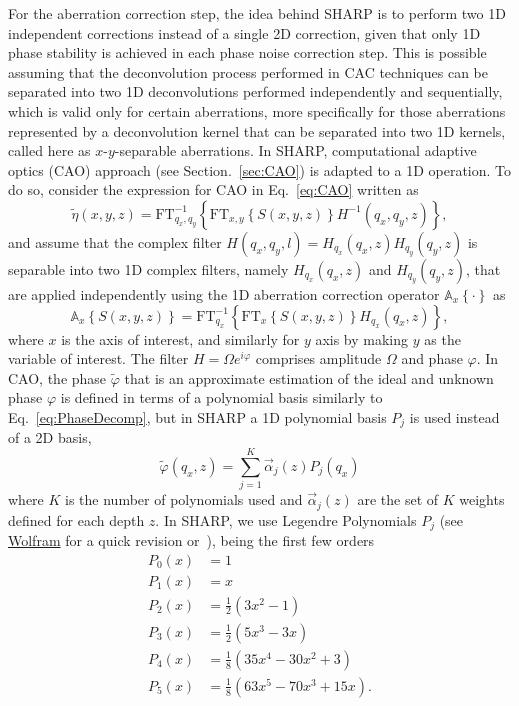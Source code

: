 For the aberration correction step, the idea behind SHARP is to perform two 1D independent corrections instead of a single 2D correction, given that only 1D phase stability is achieved in each phase noise correction step. This is possible assuming that the deconvolution process performed in CAC techniques can be separated into two 1D deconvolutions performed independently and sequentially, which is valid only for certain aberrations, more specifically for those aberrations represented by a deconvolution kernel that can be separated into two 1D kernels, called here as $x$-$y$-separable aberrations. In SHARP, computational adaptive optics (CAO) approach (see Section.~\ref{sec:CAO}) is adapted to a 1D operation. To do so, consider the expression for CAO in Eq.~\eqref{eq:CAO} written as
\begin{equation}
    \tilde{\eta}(x,y,z) = \text{FT}^{-1}_{q_x,q_y}\left\{\text{FT}_{x,y}\left\{S(x,y,z)\right\}H^{-1}(q_x,q_y,z)\right\},
\end{equation}
and assume that the complex filter $H(q_x,q_y,l)=H_{q_x}(q_x,z)H_{q_y}(q_y,z)$ is separable into two 1D complex filters, namely $H_{q_x}(q_x,z)$ and $H_{q_y}(q_y,z)$, that are applied independently using the 1D aberration correction operator $\mathbb{A}_x\left\{\cdot\right\}$ as
\begin{equation}
    \mathbb{A}_x\left\{S(x,y,z)\right\} = \text{FT}^{-1}_{q_x}\left\{\text{FT}_{x}\left\{S(x,y,z)\right\}H_{q_x}(q_x,z)\right\},
\end{equation}
where $x$ is the axis of interest, and similarly for $y$ axis by making $y$ as the variable of interest. The filter $H = \Omega e^{i\varphi}$ comprises amplitude $\Omega$ and phase $\varphi$. In CAO, the phase $\tilde{\varphi}$ that is an approximate estimation of the ideal and unknown phase $\varphi$ is defined in terms of a polynomial basis similarly to Eq.~\eqref{eq:PhaseDecomp}, but in SHARP a 1D polynomial basis $P_j$ is used instead of a 2D basis,
\begin{equation}
    \tilde{\varphi}(q_x,z) = \sum_{j=1}^K\vec{\alpha}_j(z)P_j(q_x)
\end{equation}
where $K$ is the number of polynomials used and $\vec{\alpha}_j(z)$ are the set of $K$ weights defined for each depth $z$. In SHARP, we use Legendre Polynomials $P_j$ (see \href{https://mathworld.wolfram.com/LegendrePolynomial.html}{Wolfram} for a quick revision or~\cite{Arfken2012_Legendre}), being the first few orders
\begin{align*}
    P_0(x) &= 1 \\
    P_1(x) &= x \\
    P_2(x) &= \frac{1}{2}(3x^2 - 1) \\
    P_3(x) &= \frac{1}{2}(5x^3 - 3x) \\
    P_4(x) &= \frac{1}{8}(35x^4 - 30x^2 + 3) \\
    P_5(x) &= \frac{1}{8}(63x^5 - 70x^3 + 15x).
\end{align*}

